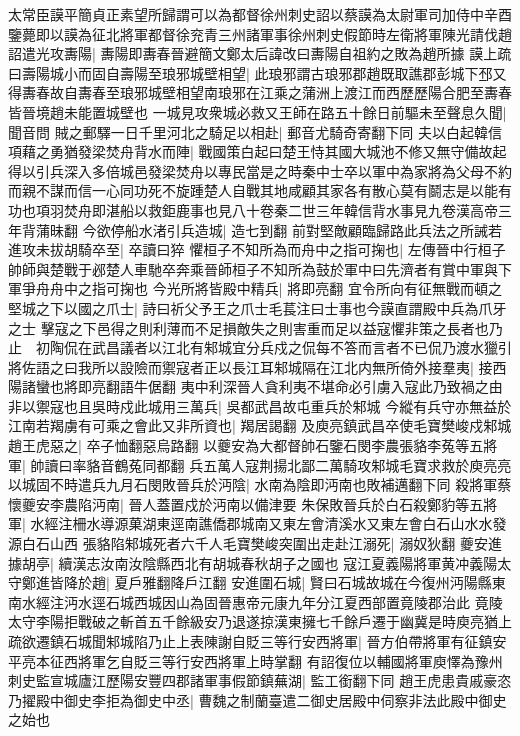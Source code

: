 太常臣謨平簡貞正素望所歸謂可以為都督徐州刺史詔以蔡謨為太尉軍司加侍中辛酉鑒薨即以謨為征北將軍都督徐兖青三州諸軍事徐州刺史假節時左衛將軍陳光請伐趙詔遣光攻夀陽|{
	夀陽即夀春晉避簡文鄭太后諱改曰夀陽自祖約之敗為趙所據}
謨上疏曰壽陽城小而固自壽陽至琅邪城壁相望|{
	此琅邪謂古琅邪郡趙既取譙郡彭城下邳又得夀春故自夀春至琅邪城壁相望南琅邪在江乘之蒲洲上渡江而西歷歷陽合肥至夀春皆晉境趙未能置城壁也}
一城見攻衆城必救又王師在路五十餘日前驅未至聲息久聞|{
	聞音問}
賊之郵驛一日千里河北之騎足以相赴|{
	郵音尤騎奇寄翻下同}
夫以白起韓信項藉之勇猶發梁焚舟背水而陣|{
	戰國策白起曰楚王恃其國大城池不修又無守備故起得以引兵深入多倍城邑發梁焚舟以專民當是之時秦中士卒以軍中為家將為父母不約而親不謀而信一心同功死不旋踵楚人自戰其地咸顧其家各有散心莫有鬬志是以能有功也項羽焚舟即湛船以救鉅鹿事也見八十卷秦二世三年韓信背水事見九卷漢高帝三年背蒲昧翻}
今欲停船水渚引兵造城|{
	造七到翻}
前對堅敵顧臨歸路此兵法之所誡若進攻未拔胡騎卒至|{
	卒讀曰猝}
懼桓子不知所為而舟中之指可掬也|{
	左傳晉中行桓子帥師與楚戰于邲楚人車馳卒奔乘晉師桓子不知所為鼓於軍中曰先濟者有賞中軍與下軍爭舟舟中之指可掬也}
今光所將皆殿中精兵|{
	將即亮翻}
宜令所向有征無戰而頓之堅城之下以國之爪士|{
	詩曰祈父予王之爪士毛萇注曰士事也今謨直謂殿中兵為爪牙之士}
擊寇之下邑得之則利薄而不足損敵失之則害重而足以益寇懼非策之長者也乃止　初陶侃在武昌議者以江北有邾城宜分兵戍之侃每不答而言者不已侃乃渡水獵引將佐語之曰我所以設險而禦寇者正以長江耳邾城隔在江北内無所倚外接羣夷|{
	接西陽諸蠻也將即亮翻語牛倨翻}
夷中利深晉人貪利夷不堪命必引虜入寇此乃致禍之由非以禦寇也且吳時戍此城用三萬兵|{
	吳都武昌故屯重兵於邾城}
今縱有兵守亦無益於江南若羯虜有可乘之會此又非所資也|{
	羯居謁翻}
及庾亮鎮武昌卒使毛寶樊峻戍邾城趙王虎惡之|{
	卒子恤翻惡烏路翻}
以夔安為大都督帥石鑒石閔李農張貉李菟等五將軍|{
	帥讀曰率貉音鶴菟同都翻}
兵五萬人寇荆揚北鄙二萬騎攻邾城毛寶求救於庾亮亮以城固不時遣兵九月石閔敗晉兵於沔陰|{
	水南為陰即沔南也敗補邁翻下同}
殺將軍蔡懷夔安李農陷沔南|{
	晉人蓋置戍於沔南以備津要}
朱保敗晉兵於白石殺鄭豹等五將軍|{
	水經注柵水導源菓湖東逕南譙僑郡城南又東左會清溪水又東左會白石山水水發源白石山西}
張貉陷邾城死者六千人毛寶樊峻突圍出走赴江溺死|{
	溺奴狄翻}
夔安進據胡亭|{
	續漢志汝南汝陰縣西北有胡城春秋胡子之國也}
寇江夏義陽將軍黄冲義陽太守鄭進皆降於趙|{
	夏戶雅翻降戶江翻}
安進圍石城|{
	賢曰石城故城在今復州沔陽縣東南水經注沔水逕石城西城因山為固晉惠帝元康九年分江夏西部置竟陵郡治此}
竟陵太守李陽拒戰破之斬首五千餘級安乃退遂掠漢東擁七千餘戶遷于幽冀是時庾亮猶上疏欲遷鎮石城聞邾城陷乃止上表陳謝自貶三等行安西將軍|{
	晉方伯帶將軍有征鎮安平亮本征西將軍乞自貶三等行安西將軍上時掌翻}
有詔復位以輔國將軍庾懌為豫州刺史監宣城廬江歷陽安豐四郡諸軍事假節鎮蕪湖|{
	監工銜翻下同}
趙王虎患貴戚豪恣乃擢殿中御史李拒為御史中丞|{
	曹魏之制蘭臺遣二御史居殿中伺察非法此殿中御史之始也}
